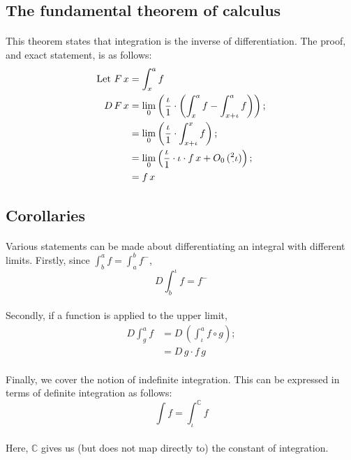 \documentclass[11pt]{article}
\newcommand*\C{\ensuremath{\mathbb C}}
\newcommand*\id{\iota}
\newcommand*\cd{\cdot}
\newcommand*\prg{\paragraph}
\newcommand*\pt{\prescript}
\begin{document}
\subsection{The fundamental theorem of calculus}
\prg{}This theorem states that integration is the inverse of differentiation. The proof, and exact statement, is as follows:
\[
\begin{aligned}
\textrm{Let }F\,x&=\int^a_xf \\
D\,F\,x&=\lim_0\left(\frac\id 1\cd\left(\int^a_xf-\int^a_{x+\id}f\right)\right); \\
&=\lim_0\left(\frac\id 1\cd\int^x_{x+\id}f\right); \\
&=\lim_0\left(\frac\id 1\cd\id\cd f\,x+O_0\,(\pt 2\cd\id)\right); \\
&=f\,x
\end{aligned}
\]
\subsection{Corollaries}
\prg{}Various statements can be made about differentiating an integral with different limits. Firstly, since $\int^a_bf=\int^b_af^-$,
\[
D\int^\id_bf=f^-
\]
\prg{}Secondly, if a function is applied to the upper limit,
\[
\begin{aligned}
D\int^a_gf&=D\,\left(\int^a_\id f\circ g\right); \\
&=D\,g\cd f\,g
\end{aligned}
\]
\prg{}Finally, we cover the notion of indefinite integration. This can be expressed in terms of definite integration as follows:
\[
\int f=\int^\C_\id f
\]
\prg{}Here, $\C$ gives us (but does not map directly to) the constant of integration.
\end{document}
